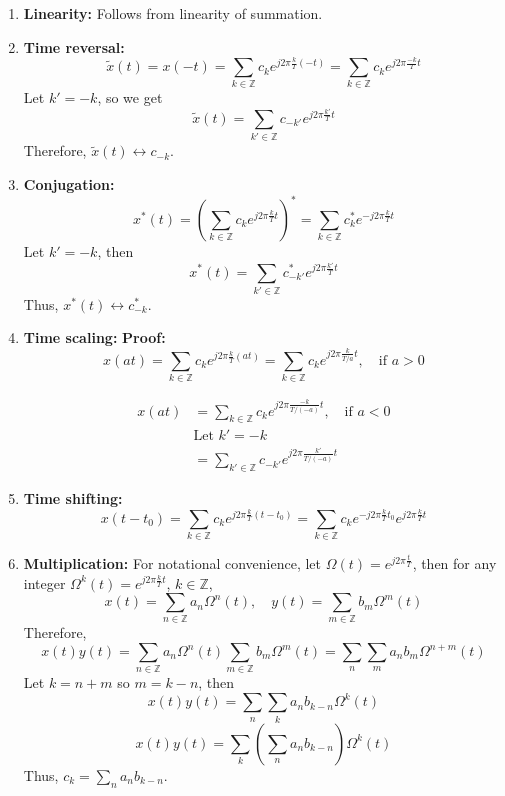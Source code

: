\begin{derivation}
    \begin{enumerate}
        \item \textbf{Linearity:} Follows from linearity of summation.
        \item \textbf{Time reversal:} 
        \[
        \tilde{x}(t) = x(-t) = \sum_{k \in \mathbb{Z}} c_k e^{j 2\pi \frac{k}{T} (-t)} = \sum_{k \in \mathbb{Z}} c_k e^{j 2\pi \frac{-k}{T} t}
        \]
        Let \( k' = -k \), so we get
        \[
        \tilde{x}(t) = \sum_{k' \in \mathbb{Z}} c_{-k'} e^{j 2\pi \frac{k'}{T} t}
        \]
        Therefore, \( \tilde{x}(t) \longleftrightarrow c_{-k} \).

        \item \textbf{Conjugation:} 
        \[
            x^*(t) = \left( \sum_{k \in \mathbb{Z}} c_k e^{j 2\pi \frac{k}{T} t} \right)^* = \sum_{k \in \mathbb{Z}} c_k^* e^{-j 2\pi \frac{k}{T} t}
            \]
            Let \( k' = -k \), then 
            \[
            x^*(t) = \sum_{k' \in \mathbb{Z}} c_{-k'}^* e^{j 2\pi \frac{k'}{T} t}
            \]
            Thus, \( x^*(t) \longleftrightarrow c_{-k}^* \).
        \item \textbf{Time scaling:}
        \textbf{Proof:} 
        \[
        x(at) = \sum_{k \in \mathbb{Z}} c_k e^{j 2\pi \frac{k}{T} (at)} = \sum_{k \in \mathbb{Z}} c_k e^{j 2\pi \frac{k}{T/a} t}, \quad \text{if } a > 0
        \]
        \vspace{1em}

        \begin{align*}
            x(at) &= \sum_{k \in \mathbb{Z}} c_k e^{j 2\pi \frac{-k}{T/(-a)} t}, \quad \text{if } a < 0 \\
            &\text{Let $k' = -k$} \\ 
            &= \sum_{k'\in \mathbb{Z}} c_{-k'} e^{j 2\pi \frac{k'}{T/(-a)} t}
        \end{align*}

        \item \textbf{Time shifting:}
        \[
        x(t - t_0) = \sum_{k \in \mathbb{Z}} c_k e^{j 2\pi \frac{k}{T} (t - t_0)} = \sum_{k \in \mathbb{Z}} c_k e^{-j 2\pi \frac{k}{T} t_0} e^{j 2\pi \frac{k}{T} t}
        \]

        \item \textbf{Multiplication:} For notational convenience, let \( \Omega(t) = e^{j 2\pi \frac{t}{T}} \), then for any integer \( \Omega^k(t) = e^{j 2\pi \frac{k}{T} t} \), \( k \in \mathbb{Z} \),
        \[
        x(t) = \sum_{n \in \mathbb{Z}} a_n \Omega^n(t), \quad y(t) = \sum_{m \in \mathbb{Z}} b_m \Omega^m(t)
        \]
        Therefore, 
        \[
        x(t) y(t) = \sum_{n \in \mathbb{Z}} a_n \Omega^n(t) \sum_{m \in \mathbb{Z}} b_m \Omega^m(t) = \sum_n \sum_m a_n b_m \Omega^{n+m}(t)
        \]
        Let \( k = n + m \) so $m=k-n$, then 
        \begin{equation*}
            x(t) y(t) = \sum_n \sum_k a_n b_{k-n} \Omega^k(t)
        \end{equation*}
        \[
        x(t) y(t) = \sum_k \left( \sum_n a_n b_{k-n} \right) \Omega^k(t)
        \]
        Thus, \( c_k = \sum_n a_n b_{k-n} \).
        

\end{enumerate}
\end{derivation}
